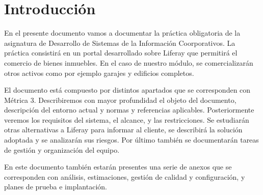 \section{Introducción}

\par En el presente documento vamos a documentar la práctica obligatoria de la asignatura de Desarrollo de Sistemas de la Información Coorporativos. La práctica consistirá en un portal desarrollado sobre Liferay que permitirá el comercio de bienes inmuebles. En el caso de nuestro módulo, se comercializarán otros activos como por ejemplo garajes y edificios completos.

\par El documento está compuesto por distintos apartados que se corresponden con Métrica 3. Describiremos con mayor profundidad el objeto del documento, descripción del entorno actual y normas y referencias aplicables. Posteriormente veremos los requisitos del sistema, el alcance, y las restricciones. Se estudiarán otras alternativas a Liferay para informar al cliente, se describirá la solución adoptada y se analizarán sus riesgos. Por último también se documentarán tareas de gestión y organización del equipo.

\par En este documento también estarán presentes una serie de anexos que se corresponden con análisis, estimaciones, gestión de calidad y configuración, y planes de prueba e implantación.